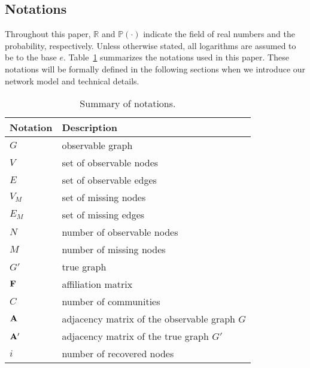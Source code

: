 \documentclass[format=acmsmall, review=false, screen=true]{acmart}
\begin{document}
\subsection{Notations}
Throughout this paper, $\mathbb{R}$ and $\mathbb{P}(\cdot)$ indicate the field of real numbers and the probability, respectively. Unless otherwise stated, all logarithms are assumed to be to the base $e$. Table~\ref{table:notation} summarizes the notations used in this paper. These notations will be formally defined in the following sections when we introduce our network model and technical details. 
\begin{table}[]
\centering
\caption{Summary of notations.}
\label{table:notation}
\begin{tabular}{l|l}
\hline
Notation               & Description                                 \\ \hline
$G$                    & observable graph                            \\
$V$                    & set of observable nodes                     \\
$E$                    & set of observable edges                     \\
$V_M$                  & set of missing nodes                        \\
$E_M$                  & set of missing edges                        \\
$N$                    & number of observable nodes                  \\
$M$                    & number of missing nodes                     \\
$G'$                   & true graph                                  \\
${\bf F}$              & affiliation matrix                          \\
$C$                    & number of communities                       \\
${\bf A}$              & adjacency matrix of the observable graph $G$   \\
${\bf A'}$             & adjacency matrix of the true graph $G'$         \\
$i$                    & number of recovered nodes                   \\

\end{tabular}
\end{table}
\end{document}
